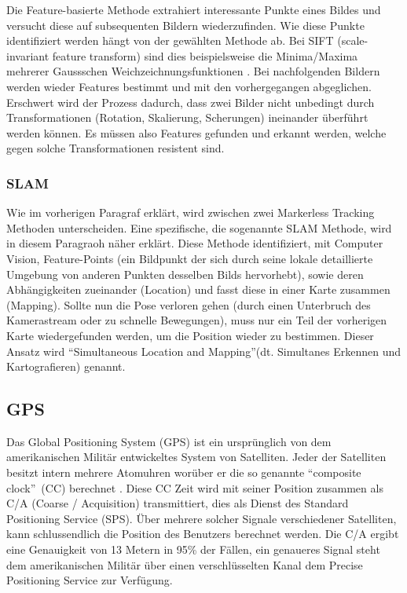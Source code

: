 \documentclass[a4paper]{scrreprt}
\begin{document}
Die Feature-basierte Methode extrahiert interessante Punkte eines Bildes und versucht diese auf subsequenten Bildern wiederzufinden. Wie diese Punkte identifiziert werden hängt von der gewählten Methode ab. Bei SIFT (scale-invariant feature transform) sind dies beispielsweise die Minima/Maxima mehrerer Gaussschen Weichzeichnungsfunktionen \parencite{Lowe1999}. Bei nachfolgenden Bildern werden wieder Features bestimmt und mit den vorhergegangen abgeglichen. Erschwert wird der Prozess dadurch, dass zwei Bilder nicht unbedingt durch Transformationen (Rotation, Skalierung, Scherungen) ineinander überführt werden können. Es müssen also Features gefunden und erkannt werden, welche gegen solche Transformationen resistent sind.

\subsubsection{SLAM}
Wie im vorherigen Paragraf erklärt, wird zwischen zwei Markerless Tracking Methoden unterscheiden. Eine spezifische, die sogenannte SLAM Methode, wird in diesem Paragraoh näher erklärt. Diese Methode identifiziert, mit Computer Vision, Feature-Points (ein Bildpunkt der sich durch seine lokale detaillierte Umgebung von anderen Punkten desselben Bilds hervorhebt), sowie deren Abhängigkeiten zueinander (Location) und fasst diese in einer Karte zusammen (Mapping). Sollte nun die Pose verloren gehen (durch einen Unterbruch des Kamerastream oder zu schnelle Bewegungen), muss nur ein Teil der vorherigen Karte wiedergefunden werden, um die Position wieder zu bestimmen. Dieser Ansatz wird \textquotedblleft Simultaneous Location and Mapping\textquotedblright (dt. Simultanes Erkennen und Kartografieren) genannt.

\subsection{GPS}
Das Global Positioning System (GPS) ist ein ursprünglich von dem amerikanischen Militär entwickeltes System von Satelliten. Jeder der Satelliten besitzt intern mehrere Atomuhren worüber er die so genannte \textquotedblleft composite clock\textquotedblright\ (CC) berechnet \parencite{GPSSysDesc2009}. Diese CC Zeit wird mit seiner Position zusammen als C/A (Coarse / Acquisition) transmittiert, dies als Dienst des Standard Positioning Service (SPS). Über mehrere solcher Signale verschiedener Satelliten, kann schlussendlich die Position des Benutzers berechnet werden. Die C/A ergibt eine Genauigkeit von 13 Metern in 95\% der Fällen, ein genaueres Signal steht dem amerikanischen Militär über einen verschlüsselten Kanal dem Precise Positioning Service zur Verfügung.
\end{document}
